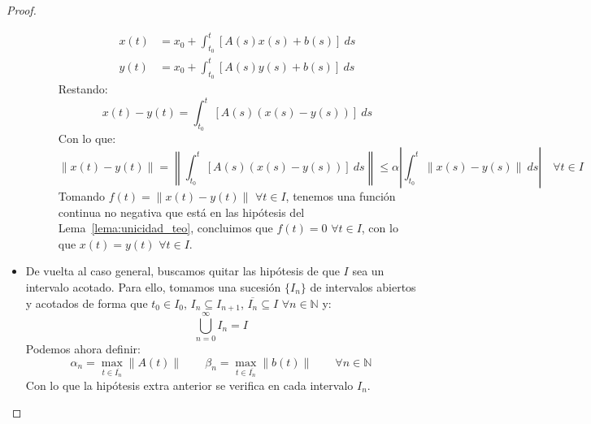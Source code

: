\begin{teo}
\begin{proof}
\begin{itemize}
\begin{description}
                        \begin{align*}
                            x(t) &= x_0 + \int_{t_0}^{t} [A(s)x(s)+b(s)]~ds \\
                            y(t) &= x_0 + \int_{t_0}^{t} [A(s)y(s)+b(s)]~ds 
                        \end{align*}
                        Restando:
                        \begin{equation*}
                            x(t) - y(t) = \int_{t_0}^{t} [A(s)(x(s)-y(s))]~ds 
                        \end{equation*}
                        Con lo que:
                        \begin{equation*}
                            \|x(t) - y(t)\| = \left\|\int_{t_0}^{t} [A(s)(x(s)-y(s))]~ds \right\| \leq \alpha\left|\int_{t_0}^{t} \|x(s)-y(s)\|~ds \right| \quad \forall t\in I
                        \end{equation*}
                        Tomando $f(t) = \|x(t)-y(t)\|$ $\forall t\in I$, tenemos una función continua no negativa que está en las hipótesis del Lema~\ref{lema:unicidad_teo}, concluimos que $f(t) = 0$ $\forall t\in I$, con lo que $x(t) = y(t)$ $\forall t\in I$.
                \end{description}
            \item De vuelta al caso general, buscamos quitar las hipótesis de que $I$ sea un intervalo acotado. Para ello, tomamos una sucesión $\{I_n\}$ de intervalos abiertos y acotados de forma que $t_0\in I_0$, $I_n\subseteq I_{n+1}$, $\overline{I_n}\subseteq I$ $\forall n\in \mathbb{N}$ y:
                \begin{equation*}
                    \bigcup_{n=0}^\infty I_n = I
                \end{equation*}
                Podemos ahora definir: 
                \begin{equation*}
                    \alpha_n = \max_{t\in \overline{I_n}} \|A(t)\| \qquad \beta_n = \max_{t\in \overline{I_n}} \|b(t)\| \qquad \forall n\in \mathbb{N}
                \end{equation*}
                Con lo que la hipótesis extra anterior se verifica en cada intervalo $I_n$.


\end{itemize}
\end{proof}
\end{teo}
